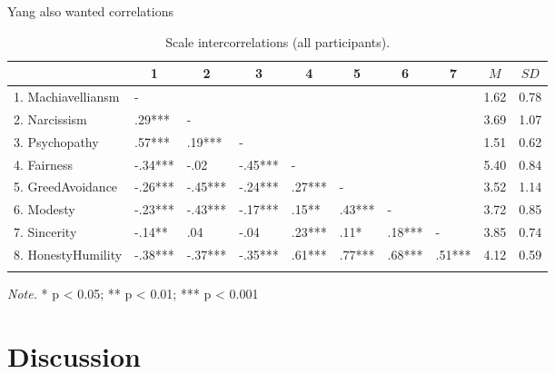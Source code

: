 \documentclass[
  english,
  man]{apa6}
\begin{document}
Yang also wanted correlations

\begin{table}[tbp]

\begin{center}
\begin{threeparttable}

\caption{\label{tab:scalecors}Scale intercorrelations (all participants).}

\begin{tabular}{llllllllll}
\toprule
 & \multicolumn{1}{c}{1} & \multicolumn{1}{c}{2} & \multicolumn{1}{c}{3} & \multicolumn{1}{c}{4} & \multicolumn{1}{c}{5} & \multicolumn{1}{c}{6} & \multicolumn{1}{c}{7} & \multicolumn{1}{c}{$M$} & \multicolumn{1}{c}{$SD$}\\
\midrule
1. Machiavelliansm & - &  &  &  &  &  &  & 1.62 & 0.78\\
2. Narcissism & .29*** & - &  &  &  &  &  & 3.69 & 1.07\\
3. Psychopathy & .57*** & .19*** & - &  &  &  &  & 1.51 & 0.62\\
4. Fairness & -.34*** & -.02 & -.45*** & - &  &  &  & 5.40 & 0.84\\
5. GreedAvoidance & -.26*** & -.45*** & -.24*** & .27*** & - &  &  & 3.52 & 1.14\\
6. Modesty & -.23*** & -.43*** & -.17*** & .15** & .43*** & - &  & 3.72 & 0.85\\
7. Sincerity & -.14** & .04 & -.04 & .23*** & .11* & .18*** & - & 3.85 & 0.74\\
8. HonestyHumility & -.38*** & -.37*** & -.35*** & .61*** & .77*** & .68*** & .51*** & 4.12 & 0.59\\
\bottomrule
\addlinespace
\end{tabular}

\begin{tablenotes}[para]
\normalsize{\textit{Note.} * p < 0.05; ** p < 0.01; *** p < 0.001}
\end{tablenotes}

\end{threeparttable}
\end{center}

\end{table}

\hypertarget{discussion}{%
\section{Discussion}\label{discussion}}

\newpage
\end{document}
